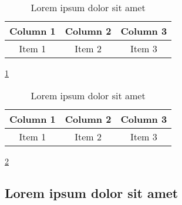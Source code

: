 \begin{table}[ht!]
    \centering
    \begin{tabular}{c c c}
        \hline
        Column 1 & Column 2 & Column 3 \\
        \hline
        Item 1   & Item 2   & Item 3   \\
    \end{tabular}
    \caption{Lorem ipsum dolor sit amet}
    \label{tab:tabA-1}
\end{table}

\lipsum[1-1] \ref{tab:tabA-1}

\begin{table}[ht!]
    \centering
    \begin{tabular}{c c c}
        \hline
        Column 1 & Column 2 & Column 3 \\
        \hline
        Item 1   & Item 2   & Item 3   \\
    \end{tabular}
    \caption{Lorem ipsum dolor sit amet}
    \label{tab:tabB-1}
\end{table}

\lipsum[1-1] \ref{tab:tabB-1}

\subsection{Lorem ipsum dolor sit amet}

\lipsum[1-2]